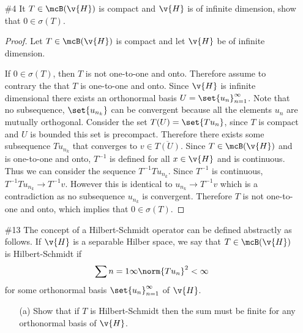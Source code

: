 \documentclass[11pt, oneside]{article}
\begin{document}
\begin{enumerate}
\begin{proof}
      Now let $T$ be a compact operator, then by problem 1 $TT^*$ is compact as
      $T^* \in \mcB(\v{H})$.
      Now since $T^{**} = T$, this implies $\p{T^*}^* T^*$ is compact as well.
      Therefore by first part of this problem $T^*$ is compact.
    \end{proof}

  \pagebreak
  \item[\#4] %
    It $T \in \mcB(\v{H})$ is compact and $\v{H}$ is of infinite dimension,
    show that $0 \in \sigma(T)$.

    \begin{proof}
      Let $T \in \mcB(\v{H})$ is compact and let $\v{H}$ be of infinite
      dimension.

      If $0 \in \sigma(T)$, then $T$ is not one-to-one and onto.
      Therefore assume to contrary the that $T$ is one-to-one and onto.
      Since $\v{H}$ is infinite dimensional there exists an orthonormal basis
      $U = \set{u_n}_{n=1}^{\infty}$.
      Note that no subsequence, $\set{u_{n_k}}$ can be convergent because all the
      elements $u_n$ are mutually orthogonal.
      Consider the set $T(U) = \set{Tu_n}$, since $T$ is compact and $U$ is
      bounded this set is precompact.
      Therefore there exists some subsequence $Tu_{n_k}$ that converges to
      $v \in \overline{T(U)}$.
      Since $T \in \mcB(\v{H})$ and is one-to-one and onto, $T^{-1}$ is defined
      for all $x \in \v{H}$ and is continuous.
      Thus we can consider the sequence $T^{-1} Tu_{n_k}$.
      Since $T^{-1}$ is continuous, $T^{-1} Tu_{n_k} \to T^{-1} v$.
      However this is identical to $u_{n_k} \to T^{-1} v$ which is a
      contradiction as no subsequence $u_{n_k}$ is convergent.
      Therefore $T$ is not one-to-one and onto, which implies that
      $0 \in \sigma(T)$.
    \end{proof}

  \pagebreak
  \item[\#13] %
    The concept of a Hilbert-Schmidt operator can be defined abstractly as
    follows.
    If $\v{H}$ is a separable Hilber space, we say that $T \in \mcB(\v{H})$ is
    Hilbert-Schmidt if
    \[
      \sum{n = 1}{\infty}{\norm{Tu_n}^2} < \infty
    \]
    for some orthonormal basis $\set{u_n}_{n = 1}^{\infty}$ of $\v{H}$.
    \begin{enumerate}
      \item[(a)] %
        Show that if $T$ is Hilbert-Schmidt then the sum must be finite for any
        orthonormal basis of $\v{H}$.


\end{enumerate}
\end{enumerate}
\end{document}
